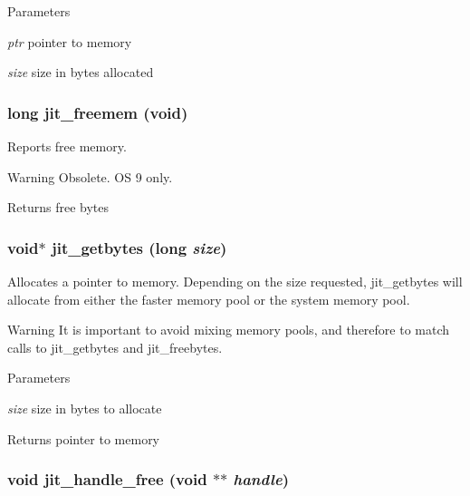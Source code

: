 \begin{DoxyParams}{Parameters}
\item[{\em ptr}]pointer to memory \item[{\em size}]size in bytes allocated \end{DoxyParams}
\hypertarget{group__memorymod_gad1723114dcc67cbb24e45cb59aa0bb4f}{
\subsubsection[{jit\_\-freemem}]{\setlength{\rightskip}{0pt plus 5cm}long jit\_\-freemem (void)}}
\label{group__memorymod_gad1723114dcc67cbb24e45cb59aa0bb4f}


Reports free memory. \begin{DoxyWarning}{Warning}
Obsolete. OS 9 only.
\end{DoxyWarning}
\begin{DoxyReturn}{Returns}
free bytes 
\end{DoxyReturn}
\hypertarget{group__memorymod_ga348f78687a0aabb79d772d633cc679cc}{
\subsubsection[{jit\_\-getbytes}]{\setlength{\rightskip}{0pt plus 5cm}void$\ast$ jit\_\-getbytes (long {\em size})}}
\label{group__memorymod_ga348f78687a0aabb79d772d633cc679cc}


Allocates a pointer to memory. Depending on the size requested, jit\_\-getbytes will allocate from either the faster memory pool or the system memory pool.

\begin{DoxyWarning}{Warning}
It is important to avoid mixing memory pools, and therefore to match calls to jit\_\-getbytes and jit\_\-freebytes.
\end{DoxyWarning}

\begin{DoxyParams}{Parameters}
\item[{\em size}]size in bytes to allocate\end{DoxyParams}
\begin{DoxyReturn}{Returns}
pointer to memory 
\end{DoxyReturn}
\hypertarget{group__memorymod_ga2710dd7978b8e7f406b525261fb42346}{
\subsubsection[{jit\_\-handle\_\-free}]{\setlength{\rightskip}{0pt plus 5cm}void jit\_\-handle\_\-free (void $\ast$$\ast$ {\em handle})}}
\label{group__memorymod_ga2710dd7978b8e7f406b525261fb42346}



